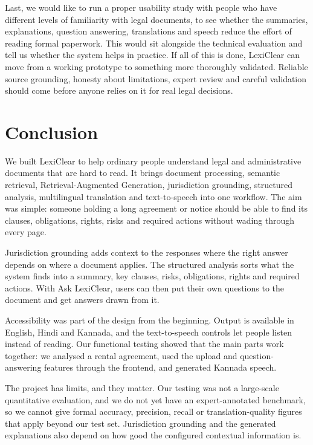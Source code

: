 \documentclass[12pt,a4paper,oneside]{report}
\begin{document}
Last, we would like to run a proper usability study with people who have different levels of familiarity with legal documents, to see whether the summaries, explanations, question answering, translations and speech reduce the effort of reading formal paperwork. This would sit alongside the technical evaluation and tell us whether the system helps in practice. If all of this is done, LexiClear can move from a working prototype to something more thoroughly validated. Reliable source grounding, honesty about limitations, expert review and careful validation should come before anyone relies on it for real legal decisions.

\chapter{Conclusion}

We built LexiClear to help ordinary people understand legal and administrative documents that are hard to read. It brings document processing, semantic retrieval, Retrieval-Augmented Generation, jurisdiction grounding, structured analysis, multilingual translation and text-to-speech into one workflow. The aim was simple: someone holding a long agreement or notice should be able to find its clauses, obligations, rights, risks and required actions without wading through every page.

Jurisdiction grounding adds context to the responses where the right answer depends on where a document applies. The structured analysis sorts what the system finds into a summary, key clauses, risks, obligations, rights and required actions. With Ask LexiClear, users can then put their own questions to the document and get answers drawn from it.

Accessibility was part of the design from the beginning. Output is available in English, Hindi and Kannada, and the text-to-speech controls let people listen instead of reading. Our functional testing showed that the main parts work together: we analysed a rental agreement, used the upload and question-answering features through the frontend, and generated Kannada speech.

The project has limits, and they matter. Our testing was not a large-scale quantitative evaluation, and we do not yet have an expert-annotated benchmark, so we cannot give formal accuracy, precision, recall or translation-quality figures that apply beyond our test set. Jurisdiction grounding and the generated explanations also depend on how good the configured contextual information is.
\end{document}
